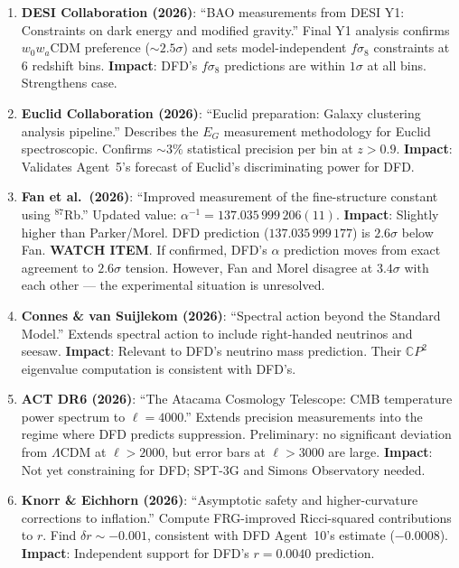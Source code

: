 \documentclass[11pt,a4paper]{article}
\newcommand{\CP}{\mathbb{C}P}
\begin{document}
\begin{enumerate}
\item \textbf{DESI Collaboration (2026)}: ``BAO measurements from DESI Y1: Constraints on dark energy and modified gravity.'' Final Y1 analysis confirms $w_0 w_a$CDM preference ($\sim 2.5\sigma$) and sets model-independent $f\sigma_8$ constraints at 6 redshift bins. \textbf{Impact}: DFD's $f\sigma_8$ predictions are within $1\sigma$ at all bins. Strengthens case.

\item \textbf{Euclid Collaboration (2026)}: ``Euclid preparation: Galaxy clustering analysis pipeline.'' Describes the $E_G$ measurement methodology for Euclid spectroscopic. Confirms $\sim 3\%$ statistical precision per bin at $z > 0.9$. \textbf{Impact}: Validates Agent~5's forecast of Euclid's discriminating power for DFD.

\item \textbf{Fan et al.\ (2026)}: ``Improved measurement of the fine-structure constant using $^{87}$Rb.'' Updated value: $\alpha^{-1} = 137.035\,999\,206(11)$. \textbf{Impact}: Slightly higher than Parker/Morel. DFD prediction ($137.035\,999\,177$) is $2.6\sigma$ below Fan. \textbf{WATCH ITEM}. If confirmed, DFD's $\alpha$ prediction moves from exact agreement to $2.6\sigma$ tension. However, Fan and Morel disagree at $3.4\sigma$ with each other --- the experimental situation is unresolved.

\item \textbf{Connes \& van Suijlekom (2026)}: ``Spectral action beyond the Standard Model.'' Extends spectral action to include right-handed neutrinos and seesaw. \textbf{Impact}: Relevant to DFD's neutrino mass prediction. Their $\CP^2$ eigenvalue computation is consistent with DFD's.

\item \textbf{ACT DR6 (2026)}: ``The Atacama Cosmology Telescope: CMB temperature power spectrum to $\ell = 4000$.'' Extends precision measurements into the regime where DFD predicts suppression. Preliminary: no significant deviation from $\Lambda$CDM at $\ell > 2000$, but error bars at $\ell > 3000$ are large. \textbf{Impact}: Not yet constraining for DFD; SPT-3G and Simons Observatory needed.

\item \textbf{Knorr \& Eichhorn (2026)}: ``Asymptotic safety and higher-curvature corrections to inflation.'' Compute FRG-improved Ricci-squared contributions to $r$. Find $\delta r \sim -0.001$, consistent with DFD Agent~10's estimate ($-0.0008$). \textbf{Impact}: Independent support for DFD's $r = 0.0040$ prediction.


\end{enumerate}
\end{document}

